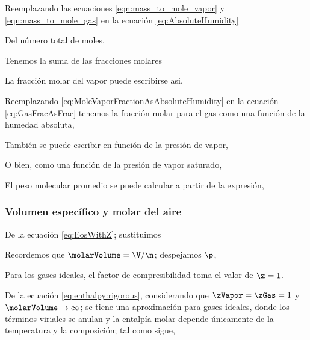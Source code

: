     Reemplazando las ecuaciones \eqref{eqn:mass_to_mole_vapor} y \eqref{eqn:mass_to_mole_gas} en la ecuación \eqref{eq:AbsoluteHumidity}
    \eqAbsoluteHumidityToMol
    
    Del número total de moles,
    \eqTotalMoles*

    Tenemos la suma de las fracciones molares    
    \eqGasFracAsVaporFrac

    \eqAbsoluteHumidityToMolAsMolarFraction

    \eqAbsoluteHumidityToMolAsMolarVaporFraction


    La fracción molar del vapor puede escribirse asi,
    \eqMoleVaporFractionAsAbsoluteHumidity

    Reemplazando \eqref{eq:MoleVaporFractionAsAbsoluteHumidity} en la ecuación \eqref{eq:GasFracAsFrac} tenemos la fracción molar para el gas como una función de la humedad absoluta,
    \eqMoleGasFractionAsAbsoluteHumidity

    También se puede escribir en función de la presión de vapor,
    \eqMixSimplAbsoluteHumidityAsPtotal

    O bien, como una función de la presión de vapor saturado,
    \eqMixSimplAbsoluteHumidityAsPtotalAndPressureSaturated


    El peso molecular promedio se puede calcular a partir de la expresión,
    \eqMolecularWeightAverage

    
\subsubsection{Volumen específico y molar del aire}
    De la ecuación \eqref{eq:EosWithZ}; sustituimos 
    \eqEosWithMolarVolumeZ*
    
    Recordemos que $\molarVolume = \V / \n$; despejamos $\p$,
    \eqEosPressureWithMolarVolumeZ*
    
    Para los gases ideales, el factor de compresibilidad toma el valor de $\z = 1$.

    \eqEnthalpyRigorous

    De la ecuación \eqref{eq:enthalpy:rigorous}, considerando que $\zVapor = \zGas = 1$ y  $\molarVolume \to \infty$; se tiene una aproximación para gases ideales, donde los términos viriales se anulan y la entalpía molar depende únicamente de la temperatura y la composición; tal como sigue,
    
